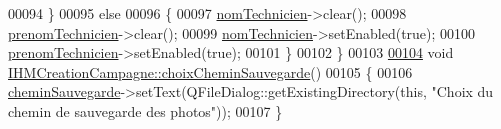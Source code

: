 \begin{DoxyCode}
00094     \}
00095     \textcolor{keywordflow}{else}
00096     \{
00097         \hyperlink{class_i_h_m_creation_campagne_a5546fee9a51daceb1b719b105427dfe9}{nomTechnicien}->clear();
00098         \hyperlink{class_i_h_m_creation_campagne_a95e0a4f224110a79731e947baa505b7e}{prenomTechnicien}->clear();
00099         \hyperlink{class_i_h_m_creation_campagne_a5546fee9a51daceb1b719b105427dfe9}{nomTechnicien}->setEnabled(\textcolor{keyword}{true});
00100         \hyperlink{class_i_h_m_creation_campagne_a95e0a4f224110a79731e947baa505b7e}{prenomTechnicien}->setEnabled(\textcolor{keyword}{true});
00101     \}
00102 \}
00103 
\hyperlink{class_i_h_m_creation_campagne_aceedbe44750998444120ae6343bbdcc6}{00104} \textcolor{keywordtype}{void} \hyperlink{class_i_h_m_creation_campagne_aceedbe44750998444120ae6343bbdcc6}{IHMCreationCampagne::choixCheminSauvegarde}()
00105 \{
00106     \hyperlink{class_i_h_m_creation_campagne_a95c12e2d42063f9c510704b87e3357da}{cheminSauvegarde}->setText(QFileDialog::getExistingDirectory(\textcolor{keyword}{this}, \textcolor{stringliteral}{"Choix du chemin de
       sauvegarde des photos"}));
00107 \}
\end{DoxyCode}
